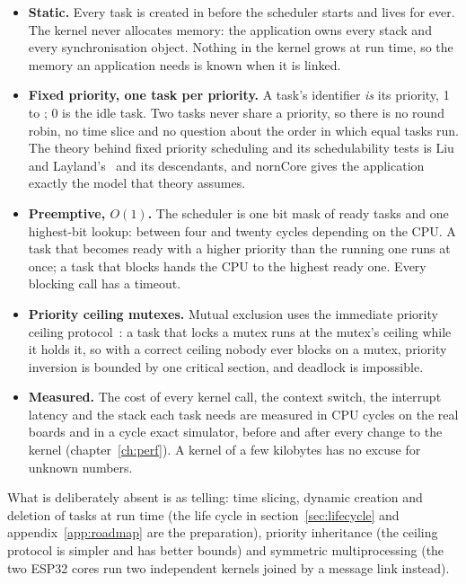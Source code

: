 \begin{itemize}
\item \textbf{Static.} Every task is created in  before the scheduler starts
  and lives for ever. The kernel never allocates memory: the application owns every stack
  and every synchronisation object. Nothing in the kernel grows at run time, so the
  memory an application needs is known when it is linked.
\item \textbf{Fixed priority, one task per priority.} A task's identifier \emph{is} its
  priority, 1 to ; 0 is the idle task. Two tasks never share
  a priority, so there is no round robin, no time slice and no question about the order
  in which equal tasks run. The theory behind fixed priority scheduling and its
  schedulability tests is Liu and Layland's~\cite{liulayland} and its descendants, and
  nornCore gives the application exactly the model that theory assumes.
\item \textbf{Preemptive, $O(1)$.} The scheduler is one bit mask of ready tasks and one
  highest-bit lookup: between four and twenty cycles depending on the CPU. A task that
  becomes ready with a higher priority than the running one runs at once; a task that
  blocks hands the CPU to the highest ready one. Every blocking call has a timeout.
\item \textbf{Priority ceiling mutexes.} Mutual exclusion uses the immediate priority
  ceiling protocol~\cite{shaetal,baker}: a task that locks a mutex runs at the mutex's
  ceiling while it holds it, so with a correct ceiling nobody ever blocks on a mutex,
  priority inversion is bounded by one critical section, and deadlock is impossible.
\item \textbf{Measured.} The cost of every kernel call, the context switch, the interrupt
  latency and the stack each task needs are measured in CPU cycles on the real boards and
  in a cycle exact simulator, before and after every change to the kernel
  (chapter~\ref{ch:perf}). A kernel of a few kilobytes has no excuse for unknown numbers.
\end{itemize}

What is deliberately absent is as telling: time slicing, dynamic creation and deletion of
tasks at run time (the life cycle in section~\ref{sec:lifecycle} and
appendix~\ref{app:roadmap} are the preparation), priority inheritance (the ceiling
protocol is simpler and has better bounds) and symmetric multiprocessing (the two ESP32
cores run two independent kernels joined by a message link instead).

